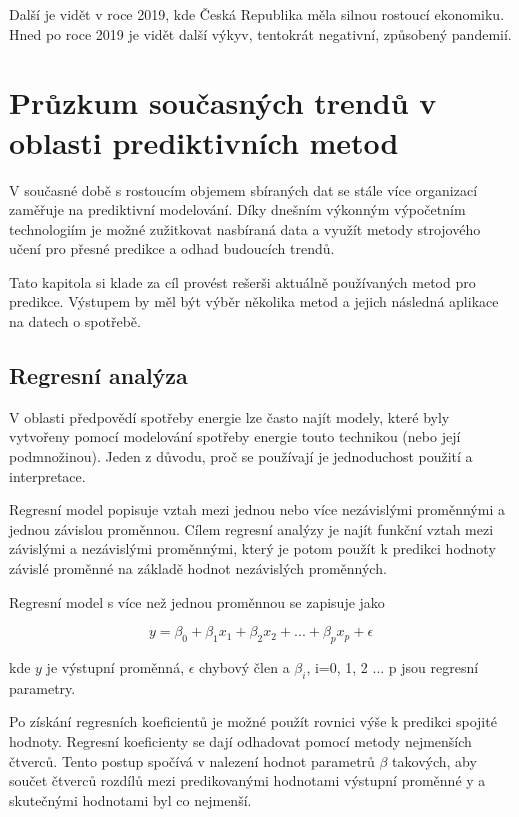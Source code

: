 \documentclass[FM,BP,fonts]{tulthesis}
\begin{document}
 Další je vidět v roce 2019, kde Česká Republika měla silnou rostoucí ekonomiku. Hned po roce 2019 je vidět další výkyv, tentokrát negativní, způsobený pandemií.

\chapter{Průzkum současných trendů v oblasti prediktivních metod}
V současné době s rostoucím objemem sbíraných dat se stále více organizací zaměřuje na prediktivní modelování. Díky dnešním výkonným výpočetním technologiím je možné zužitkovat nasbíraná data a využít metody strojového učení pro přesné predikce a odhad budoucích trendů.

Tato kapitola si klade za cíl provést rešerši aktuálně používaných metod pro predikce. Výstupem by měl být výběr několika metod a jejich následná aplikace na datech o spotřebě.

\section{Regresní analýza}
V oblasti předpovědí spotřeby energie lze často najít modely, které byly vytvořeny pomocí modelování spotřeby energie touto technikou (nebo její podmnožinou). Jeden z důvodu, proč se používají je jednoduchost použití a interpretace.

Regresní model popisuje vztah mezi jednou nebo více nezávislými proměnnými a jednou závislou proměnnou. Cílem regresní analýzy je najít funkční vztah mezi závislými a nezávislými proměnnými, který je potom použít k predikci hodnoty závislé proměnné na základě hodnot nezávislých proměnných.

Regresní model s více než jednou proměnnou se zapisuje jako

\begin{equation}
	y = \beta_0 + \beta_1x_1 + \beta_2x_2 + ... + \beta_px_p +  \epsilon
\end{equation}

kde $y$ je výstupní proměnná, $\epsilon$ chybový člen a $\beta_i$, i=0, 1, 2 ... p jsou regresní parametry.

Po získání regresních koeficientů je možné použít rovnici výše k predikci spojité hodnoty. Regresní koeficienty se dají odhadovat pomocí metody nejmenších čtverců. Tento postup spočívá v nalezení hodnot parametrů $\beta$ takových, aby součet čtverců rozdílů mezi predikovanými hodnotami výstupní proměnné y a skutečnými hodnotami byl co nejmenší.  \cite{hanousek1992moderni}
\end{document}
